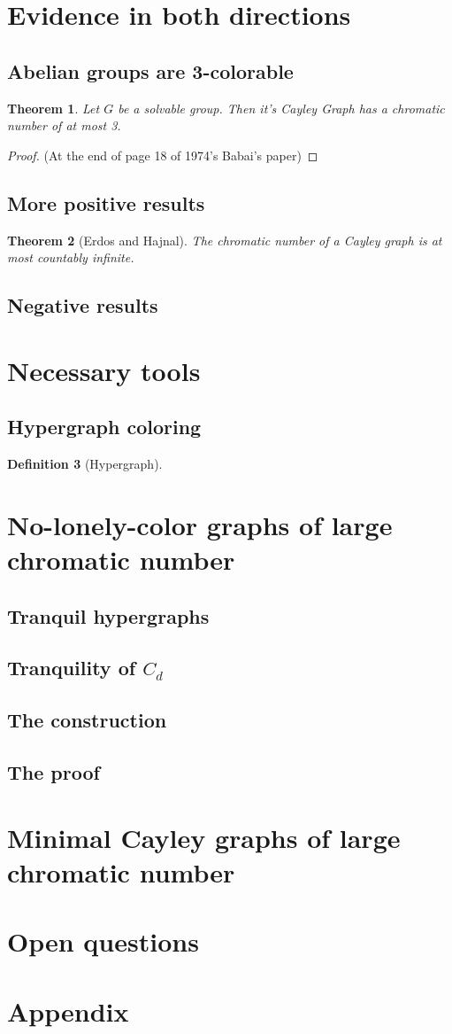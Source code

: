 \documentclass[a4paper,10pt]{article}
\numberwithin{equation}{section}
\newtheorem{theorem}{Theorem}[section]
\theoremstyle{definition}
\newtheorem{definition}[theorem]{Definition}
\begin{document}
\section{Evidence in both directions}
\subsection{Abelian groups are 3-colorable}
    \begin{theorem}
        Let \(G\) be  a solvable group. Then it's Cayley Graph has a chromatic number of at most 3.
    \end{theorem}
    \begin{proof}
        (At the end of page 18 of 1974's Babai's paper)
    \end{proof}
\subsection{More positive results}
    \begin{theorem}[Erdos and Hajnal]
        The chromatic number of a Cayley graph is at most countably infinite.
    \end{theorem}
\subsection{Negative results}
\section{Necessary tools}
    \subsection{Hypergraph coloring}
    \begin{definition}[Hypergraph]
        \todo{}
    \end{definition}
\section{No-lonely-color graphs of large chromatic number}
\subsection{Tranquil hypergraphs}
\subsection{Tranquility of \texorpdfstring{\(C_d\)}{C\_d}}
\subsection{The construction}
\subsection{The proof}
\section{Minimal Cayley graphs of large chromatic number}
\section{Open questions}
\section{Appendix}


\end{document}
